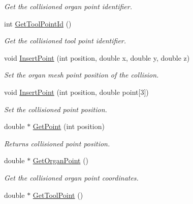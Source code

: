 \begin{DoxyCompactItemize}
\begin{DoxyCompactList}\small\item\em Get the collisioned organ point identifier. \item\end{DoxyCompactList}\item 
\hypertarget{classvtkContact_a687823eb62aa7a002e4b6aa5eb29c525}{
int \hyperlink{classvtkContact_a687823eb62aa7a002e4b6aa5eb29c525}{GetToolPointId} ()}
\label{classvtkContact_a687823eb62aa7a002e4b6aa5eb29c525}

\begin{DoxyCompactList}\small\item\em Get the collisioned tool point identifier. \item\end{DoxyCompactList}\item 
void \hyperlink{classvtkContact_a16a56cca72694b4dc56872321e6f31e8}{InsertPoint} (int position, double x, double y, double z)
\begin{DoxyCompactList}\small\item\em Set the organ mesh point position of the collision. \item\end{DoxyCompactList}\item 
void \hyperlink{classvtkContact_a7efd643d147764c928443a0950804b38}{InsertPoint} (int position, double point\mbox{[}3\mbox{]})
\begin{DoxyCompactList}\small\item\em Set the collisioned point position. \item\end{DoxyCompactList}\item 
double $\ast$ \hyperlink{classvtkContact_a03931eb9be6db9e78e5228d7bc37996f}{GetPoint} (int position)
\begin{DoxyCompactList}\small\item\em Returns collisioned point position. \item\end{DoxyCompactList}\item 
\hypertarget{classvtkContact_ab34adfc8b3aef556ee01e6f82174c936}{
double $\ast$ \hyperlink{classvtkContact_ab34adfc8b3aef556ee01e6f82174c936}{GetOrganPoint} ()}
\label{classvtkContact_ab34adfc8b3aef556ee01e6f82174c936}

\begin{DoxyCompactList}\small\item\em Get the collisioned organ point coordinates. \item\end{DoxyCompactList}\item 
\hypertarget{classvtkContact_a7a6259deea9301cfb78b2d4b4e8814da}{
double $\ast$ \hyperlink{classvtkContact_a7a6259deea9301cfb78b2d4b4e8814da}{GetToolPoint} ()}
\label{classvtkContact_a7a6259deea9301cfb78b2d4b4e8814da}


\end{DoxyCompactItemize}
